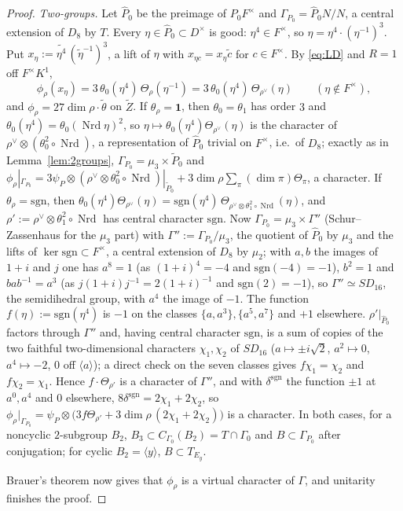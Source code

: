 \documentclass[11pt]{article}
\newcommand{\Nrd}{\operatorname{Nrd}}
\newcommand{\tZ}{\widetilde Z}
\newcommand{\tth}{\widetilde\theta}
\theoremstyle{plain}
\theoremstyle{definition}
\begin{document}
\begin{proof}
\emph{Two-groups.}  Let $\hat P_0$ be the preimage of $P_0F^\times$ and
$\Gamma_{P_0}=\hat P_0N/N$, a central extension of $D_8$ by $T$.  Every
$\eta\in\hat P_0\subset D^\times$ is good: $\eta^4\in F^\times$, so
$\eta=\eta^4\cdot(\eta^{-1})^3$.  Put $x_\eta:=\widetilde{\eta^4}\,(\tilde\eta^{-1})^3$,
a lift of $\eta$ with $x_{\eta c}=x_\eta\tilde c$ for $c\in F^\times$.  By
\eqref{eq:LD} and $R=1$ off $F^\times K^1$,
\[
 \phi_\rho(x_\eta)=3\,\theta_0(\eta^4)\,\Theta_\rho(\eta^{-1})
 =3\,\theta_0(\eta^4)\,\Theta_{\rho^\vee}(\eta)\qquad(\eta\notin F^\times),
\]
and $\phi_\rho=27\dim\rho\cdot\tth$ on $\tZ$.  If $\theta_\rho=\mathbf1$,
then $\theta_0=\theta_1$ has order $3$ and
$\theta_0(\eta^4)=\theta_0(\Nrd\eta)^{2}$, so
$\eta\mapsto\theta_0(\eta^4)\Theta_{\rho^\vee}(\eta)$ is the character of
$\rho^\vee\otimes(\theta_0^2\circ\Nrd)$, a representation of $\hat P_0$
trivial on $F^\times$, i.e.\ of $D_8$; exactly as in
Lemma~\ref{lem:2groups}, $\Gamma_{P_0}=\mu_3\times\tilde P_0$ and
$\phi_\rho|_{\Gamma_{P_0}}=3\psi_P\otimes(\rho^\vee\otimes\theta_0^2\circ\Nrd)|_{\tilde P_0}+3\dim\rho\sum_\pi(\dim\pi)\Theta_\pi$,
a character.  If $\theta_\rho=\mathrm{sgn}$, then
$\theta_0(\eta^4)\Theta_{\rho^\vee}(\eta)=\mathrm{sgn}(\eta^4)\,\Theta_{\rho^\vee\otimes\theta_1^2\circ\Nrd}(\eta)$,
and $\rho':=\rho^\vee\otimes\theta_1^2\circ\Nrd$ has central character
$\mathrm{sgn}$.  Now $\Gamma_{P_0}=\mu_3\times\Gamma''$ (Schur--Zassenhaus for the
$\mu_3$ part) with $\Gamma'':=\Gamma_{P_0}/\mu_3$, the quotient of
$\hat P_0$ by $\mu_3$ and the lifts of $\ker\mathrm{sgn}\subset F^\times$,
a central extension of $D_8$ by $\mu_2$; with $a,b$ the images of
$1+i$ and $j$ one has $a^8=1$ (as $(1+i)^4=-4$ and $\mathrm{sgn}(-4)=-1$),
$b^2=1$ and $bab^{-1}=a^3$ (as $j(1+i)j^{-1}=2(1+i)^{-1}$ and
$\mathrm{sgn}(2)=-1$), so $\Gamma''\simeq SD_{16}$, the semidihedral group,
with $a^4$ the image of $-1$.  The function $f(\eta):=\mathrm{sgn}(\eta^4)$
is $-1$ on the classes $\{a,a^3\},\{a^5,a^7\}$ and $+1$ elsewhere.
$\rho'|_{\hat P_0}$ factors through $\Gamma''$ and, having central
character $\mathrm{sgn}$, is a sum of copies of the two faithful
two-dimensional characters $\chi_1,\chi_2$ of $SD_{16}$ ($a\mapsto\pm i\sqrt2$,
$a^2\mapsto0$, $a^4\mapsto-2$, $0$ off $\langle a\rangle$); a direct
check on the seven classes gives $f\chi_1=\chi_2$ and $f\chi_2=\chi_1$.
Hence $f\cdot\Theta_{\rho'}$ is a character of $\Gamma''$, and with
$\delta^{\mathrm{sgn}}$ the function $\pm1$ at $a^{0},a^4$ and $0$
elsewhere, $8\delta^{\mathrm{sgn}}=2\chi_1+2\chi_2$, so
$\phi_\rho|_{\Gamma_{P_0}}=\psi_P\otimes\bigl(3f\Theta_{\rho'}+3\dim\rho\,(2\chi_1+2\chi_2)\bigr)$
is a character.  In both cases, for a noncyclic $2$-subgroup $B_2$,
$B_3\subset C_{\Gamma_0}(B_2)=T\cap\Gamma_0$ and $B\subset\Gamma_{P_0}$
after conjugation; for cyclic $B_2=\langle y\rangle$, $B\subset T_{E_y}$.

Brauer's theorem now gives that $\phi_\rho$ is a virtual character of
$\Gamma$, and unitarity finishes the proof.
\end{proof}
\end{document}
